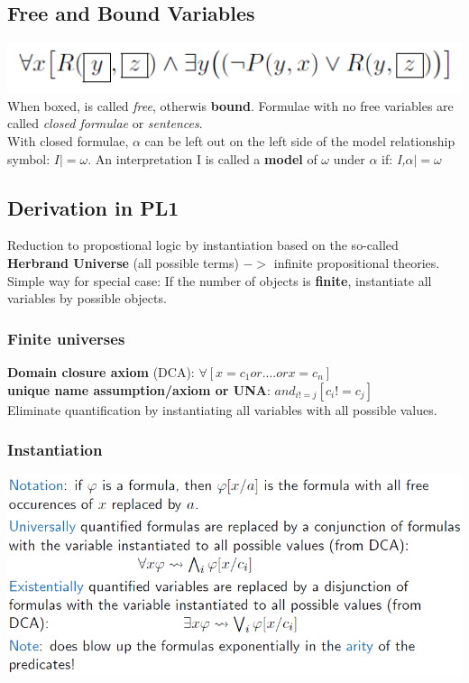 \documentclass{article}
\begin{document}
\subsection{Free and Bound Variables}
\includegraphics[scale=0.6]{46.png}\\
When boxed, is called \textit{free}, otherwis \textbf{bound}. Formulae with no free variables are called \textit{closed formulae} or \textit{sentences}.\\
With closed formulae, $\alpha$ can be left out on the left side of the model
relationship symbol: $I |= \omega$. An interpretation I is called a \textbf{model} of $\omega$ under $\alpha$ if: \textit{I,$\alpha|=\omega$}\\
\subsection{Derivation in PL1}
Reduction to propostional logic by instantiation based on the so-called \textbf{Herbrand Universe} (all possible terms) $->$ infinite propositional theories.\\
Simple way for special case: If the number of objects is \textbf{finite}, instantiate all variables by possible objects.\\
\subsubsection{Finite universes}
\textbf{Domain closure axiom }(DCA): $\forall[x=c_1 or .... or x=c_n]$\\
\textbf{unique name assumption/axiom or UNA}: $and_{i!=j}[c_i!=c_j]$\\
Eliminate quantification by instantiating all variables with all possible
values.\\
\subsubsection{Instantiation}
\includegraphics[scale=0.6]{47.png}
\end{document}
